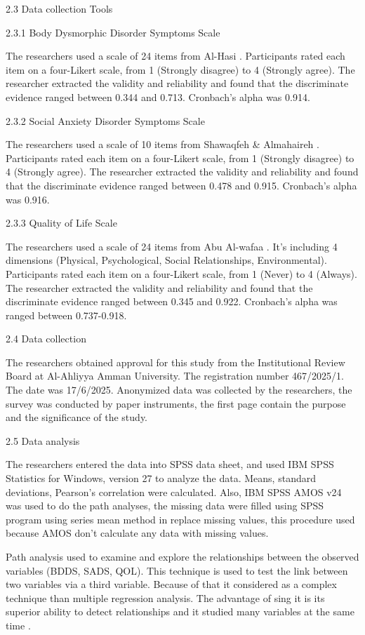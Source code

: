 \documentclass[10pt]{NSP1}
\begin{document}
2.3 Data collection Tools

2.3.1 Body Dysmorphic Disorder Symptoms Scale

The researchers used a scale of 24 items from Al-Hasi \cite{ref12}. Participants rated each item on a four-Likert scale, from 1 (Strongly disagree) to 4 (Strongly agree). The researcher extracted the validity and reliability and found that the discriminate evidence ranged between 0.344 and 0.713. Cronbach’s alpha was 0.914.

2.3.2 Social Anxiety Disorder Symptoms Scale

The researchers used a scale of 10 items from Shawaqfeh \& Almahaireh \cite{ref13}. Participants rated each item on a four-Likert scale, from 1 (Strongly disagree) to 4 (Strongly agree). The researcher extracted the validity and reliability and found that the discriminate evidence ranged between 0.478 and 0.915. Cronbach’s alpha was 0.916.

2.3.3 Quality of Life Scale

The researchers used a scale of 24 items from Abu Al-wafaa \cite{ref14}. It’s including 4 dimensions (Physical, Psychological, Social Relationships, Environmental). Participants rated each item on a four-Likert scale, from 1 (Never) to 4 (Always). The researcher extracted the validity and reliability and found that the discriminate evidence ranged between 0.345 and 0.922. Cronbach’s alpha was ranged between 0.737-0.918.

2.4 Data collection

The researchers obtained approval for this study from the Institutional Review Board at Al-Ahliyya Amman University. The registration number 467/2025/1. The date was 17/6/2025. Anonymized data was collected by the researchers, the survey was conducted by paper instruments, the first page contain the purpose and the significance of the study.

2.5 Data analysis

The researchers entered the data into SPSS data sheet, and used IBM SPSS Statistics for Windows, version 27 to analyze the data. Means, standard deviations, Pearson’s correlation were calculated. Also, IBM SPSS AMOS v24 was used to do the path analyses, the missing data were filled using SPSS program using series mean method in replace missing values, this procedure used because AMOS don’t calculate any data with missing values.

Path analysis used to examine and explore the relationships between the observed variables (BDDS, SADS, QOL). This technique is used to test the link between two variables via a third variable. Because of that it considered as a complex technique than multiple regression analysis. The advantage of sing it is its superior ability to detect relationships and it studied many variables at the same time \cite{ref15}.
\end{document}
